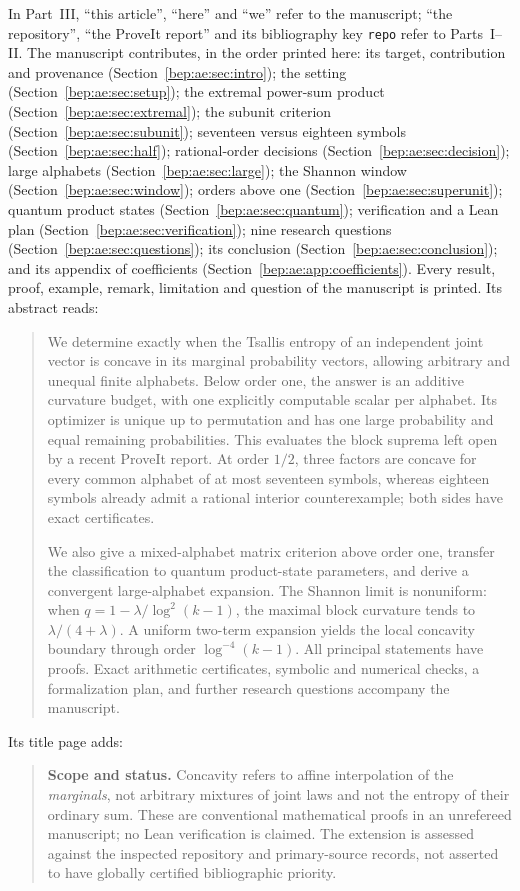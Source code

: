\documentclass[11pt]{article}
\numberwithin{equation}{section}
\theoremstyle{definition}
\theoremstyle{remark}
\begin{document}
In Part~III, ``this article'', ``here'' and ``we'' refer to the
manuscript; ``the repository'', ``the ProveIt report'' and its
bibliography key \texttt{repo} refer to Parts~I--II. The manuscript contributes, in the order printed
here: its target, contribution and provenance
(Section~\ref{bep:ae:sec:intro}); the setting
(Section~\ref{bep:ae:sec:setup}); the extremal power-sum product
(Section~\ref{bep:ae:sec:extremal}); the subunit criterion
(Section~\ref{bep:ae:sec:subunit}); seventeen versus eighteen symbols
(Section~\ref{bep:ae:sec:half}); rational-order decisions
(Section~\ref{bep:ae:sec:decision}); large alphabets
(Section~\ref{bep:ae:sec:large}); the Shannon window
(Section~\ref{bep:ae:sec:window}); orders above one
(Section~\ref{bep:ae:sec:superunit}); quantum product states
(Section~\ref{bep:ae:sec:quantum}); verification and a Lean plan
(Section~\ref{bep:ae:sec:verification}); nine research questions
(Section~\ref{bep:ae:sec:questions}); its conclusion
(Section~\ref{bep:ae:sec:conclusion}); and its appendix of coefficients
(Section~\ref{bep:ae:app:coefficients}). Every result, proof, example,
remark, limitation and question of the manuscript is printed. Its
abstract reads:
\begin{quote}\small
We determine exactly when the Tsallis entropy of an independent joint
vector is concave in its marginal probability vectors, allowing arbitrary
and unequal finite alphabets. Below order one, the answer is an additive
curvature budget, with one explicitly computable scalar per alphabet.
Its optimizer is unique up to permutation and has one large probability
and equal remaining probabilities. This evaluates the block suprema left
open by a recent ProveIt report. At order $1/2$, three factors are concave
for every common alphabet of at most seventeen symbols, whereas eighteen
symbols already admit a rational interior counterexample; both sides have
exact certificates.

We also give a mixed-alphabet matrix criterion above order one, transfer
the classification to quantum product-state parameters, and derive a
convergent large-alphabet expansion. The Shannon limit is nonuniform:
when $q=1-\lambda/\log^2(k-1)$, the maximal block curvature tends to
$\lambda/(4+\lambda)$. A uniform two-term expansion yields the local
concavity boundary through order $\log^{-4}(k-1)$. All principal statements
have proofs. Exact arithmetic certificates, symbolic and numerical
checks, a formalization plan, and further research questions accompany
the manuscript.
\end{quote}
Its title page adds:
\begin{quote}\small
\textbf{Scope and status.} Concavity refers to affine interpolation of the
\emph{marginals}, not arbitrary mixtures of joint laws and not the entropy
of their ordinary sum. These are conventional mathematical proofs in an
unrefereed manuscript; no Lean verification is claimed. The extension is
assessed against the inspected repository and primary-source records,
not asserted to have globally certified bibliographic priority.
\end{quote}
\end{document}
